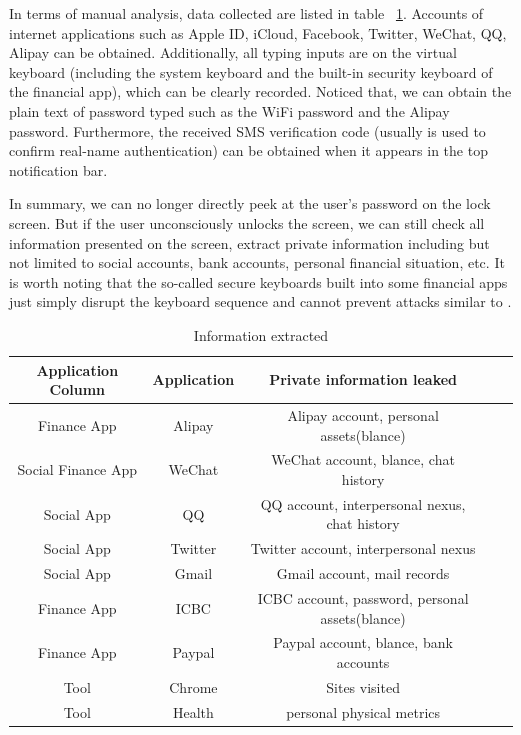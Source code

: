 In terms of manual analysis, data collected are listed in table ~\ref{table:information_extracted}. Accounts of internet applications such as Apple ID, iCloud, Facebook, Twitter, WeChat, QQ, Alipay can be obtained. Additionally, all typing inputs are on the virtual keyboard (including the system keyboard and the built-in security keyboard of the financial app), which can be clearly recorded. Noticed that, we can obtain the plain text of password typed such as the WiFi password and the Alipay password. Furthermore, the received SMS verification code (usually is used to confirm real-name authentication) can be obtained when it appears in the top notification bar. 


In summary, we can no longer directly peek at the user’s password on the lock screen. But if the user unconsciously unlocks the screen, we can still check all information presented on the screen, extract private information including but not limited to social accounts, bank accounts, personal financial situation, etc. It is worth noting that the so-called secure keyboards built into some financial apps just simply disrupt the keyboard sequence and cannot prevent attacks similar to \tool.


\begin{table}[hbtp]
	\centering
	\begin{tabular}{|c|c|c|c|c|}
		\hline
		Application Column  & Application & Private information leaked                       \\
		\hline
		Finance App         & Alipay      & Alipay account, personal assets(blance)          \\
		\hline
		Social  Finance App & WeChat      & WeChat account, blance, chat history             \\
		\hline
		Social App          & QQ          & QQ account, interpersonal nexus, chat history    \\
		\hline
		Social App          & Twitter     & Twitter account, interpersonal nexus             \\
		\hline
		Social App          & Gmail       & Gmail account, mail records                      \\
		\hline
		Finance App         & ICBC        & ICBC account, password, personal assets(blance)  \\
		\hline
		Finance App         & Paypal      & Paypal account, blance, bank accounts            \\
		\hline
		Tool                & Chrome      & Sites visited                                    \\
		\hline
		Tool                & Health      & personal physical metrics      					 \\
		\hline
	\end{tabular}
	\linebreak
	\caption{Information extracted}
	\label{table:information_extracted}
\end{table}
